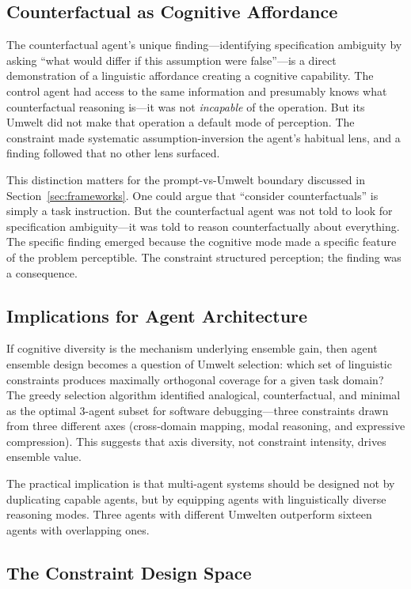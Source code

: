 \documentclass[11pt,a4paper]{article}
\begin{document}
\subsection{Counterfactual as Cognitive Affordance}

The counterfactual agent's unique finding---identifying specification ambiguity by asking ``what would differ if this assumption were false''---is a direct demonstration of a linguistic affordance creating a cognitive capability. The control agent had access to the same information and presumably knows what counterfactual reasoning is---it was not \emph{incapable} of the operation. But its Umwelt did not make that operation a default mode of perception. The constraint made systematic assumption-inversion the agent's habitual lens, and a finding followed that no other lens surfaced.

This distinction matters for the prompt-vs-Umwelt boundary discussed in Section~\ref{sec:frameworks}. One could argue that ``consider counterfactuals'' is simply a task instruction. But the counterfactual agent was not told to look for specification ambiguity---it was told to reason counterfactually about everything. The specific finding emerged because the cognitive mode made a specific feature of the problem perceptible. The constraint structured perception; the finding was a consequence.

\subsection{Implications for Agent Architecture}

If cognitive diversity is the mechanism underlying ensemble gain, then agent ensemble design becomes a question of Umwelt selection: which set of linguistic constraints produces maximally orthogonal coverage for a given task domain? The greedy selection algorithm identified analogical, counterfactual, and minimal as the optimal 3-agent subset for software debugging---three constraints drawn from three different axes (cross-domain mapping, modal reasoning, and expressive compression). This suggests that axis diversity, not constraint intensity, drives ensemble value.

The practical implication is that multi-agent systems should be designed not by duplicating capable agents, but by equipping agents with linguistically diverse reasoning modes. Three agents with different Umwelten outperform sixteen agents with overlapping ones.

\subsection{The Constraint Design Space}
\end{document}
